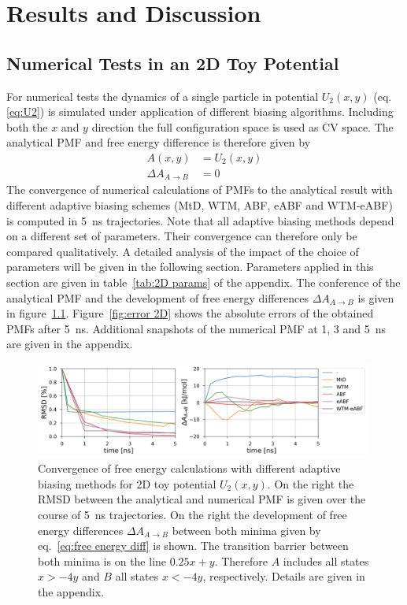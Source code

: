\chapter{Results and Discussion}
\label{cha:results}
\section{Numerical Tests in an 2D Toy Potential}
\label{sec:2D}
For numerical tests the dynamics of a single particle in potential $U_2(x,y)$ (eq. \ref{eq:U2}) is simulated under application of different biasing algorithms.
Including both the $x$ and $y$ direction the full configuration space is used as CV space.
The analytical PMF and free energy difference is therefore given by
\begin{equation}
  \begin{split}
    A(x,y)&=U_2(x,y) \\
    \Delta A_{A\to B} &= 0
  \end{split}
\end{equation}
The convergence of numerical calculations of PMFs to the analytical result with different adaptive biasing schemes (MtD, WTM, ABF, eABF and WTM-eABF) is computed in 5~ns trajectories.
Note that all adaptive biasing methods depend on a different set of parameters.
Their convergence can therefore only be compared qualitatively.
A detailed analysis of the impact of the choice of parameters will be given in the following section.
Parameters applied in this section are given in table~\ref{tab:2D params} of the appendix.
The conference of the analytical PMF and the development of free energy differences $\Delta A_{A\to B}$ is given in figure~\ref{fig:conv 2D}.
Figure~\ref{fig:error 2D} shows the absolute errors of the obtained PMFs after 5~ns.
Additional snapshots of the numerical PMF at 1, 3 and 5~ns are given in the appendix.
\begin{figure}[H]
   \centering
   \includegraphics[width=0.99\textwidth]{bilder/test_2D/conv}
   \caption{Convergence of free energy calculations with different adaptive biasing methods for 2D toy potential $U_2(x,y)$. On the right the RMSD between the analytical and numerical PMF is given over the course of 5~ns trajectories. On the right the development of free energy differences $\Delta A_{A\to B}$ between both minima given by eq.~\ref{eq:free energy diff} is shown. The transition barrier between both minima is on the line $0.25x+y$. Therefore $A$ includes all states $x>-4y$ and $B$ all states $x<-4y$, respectively. Details are given in the appendix.}
 \label{fig:conv 2D}%
 \end{figure}
